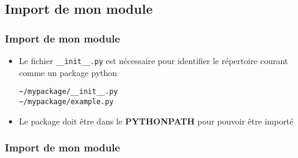 \subsection{Import de mon module}
\begin{frame}[fragile]
  \frametitle{Import de mon module}
    \begin{itemize}
      \item Le fichier \verb=__init__.py= est nécessaire pour identifier le répertoire courant comme un package python
      \begin{lstlisting}
~/mypackage/__init__.py
~/mypackage/example.py
      \end{lstlisting}
      \pause
      \item Le package doit être dans le {\bf PYTHONPATH} pour pouvoir être importé
    \end{itemize}
\end{frame}

\begin{frame}[fragile]
\frametitle{Import de mon module}
\begin{ipython}
\ipoutp{['', '/usr/bin', '/usr/local/lib/python2.6/dist}
\ipwrapp{-packages', ...]}
\end{ipython}
\end{frame}

